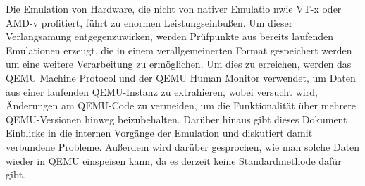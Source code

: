 
\Abstract
Die Emulation von Hardware, die nicht von nativer Emulatio nwie VT-x oder AMD-v profitiert, führt zu enormen Leistungseinbußen.
Um dieser Verlangsamung entgegenzuwirken, werden Prüfpunkte aus bereits laufenden Emulationen erzeugt,
die in einem verallgemeinerten Format gespeichert werden um eine weitere Verarbeitung zu ermöglichen.
Um dies zu erreichen, werden das QEMU Machine Protocol und der QEMU Human Monitor verwendet, um Daten aus einer laufenden QEMU-Instanz zu extrahieren,
wobei versucht wird, Änderungen am QEMU-Code zu vermeiden, um die Funktionalität über mehrere QEMU-Versionen hinweg beizubehalten.
Darüber hinaus gibt dieses Dokument Einblicke in die internen Vorgänge der Emulation und diskutiert damit verbundene Probleme.
Außerdem wird darüber gesprochen, wie man solche Daten wieder in QEMU einspeisen kann,
da es derzeit keine Standardmethode dafür gibt.